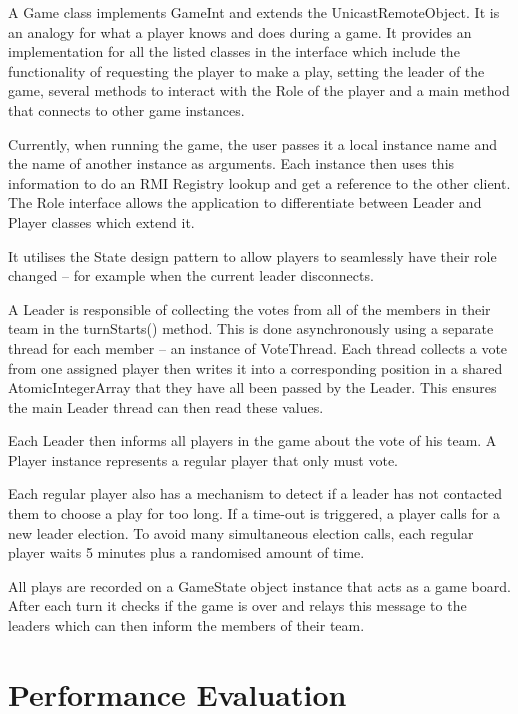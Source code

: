 \documentclass[conference]{IEEEtran}
\begin{document}
A Game class implements GameInt and extends the UnicastRemoteObject. It is an analogy for what a player knows and does during a game. It provides an implementation for all the listed classes in the interface which include the functionality of requesting the player to make a play, setting the leader of the game, several methods to interact with the Role of the player and a main method that connects to other game instances.
 
Currently, when running the game, the user passes it a local instance name and the name of another instance as arguments. Each instance then uses this information to do an RMI Registry lookup and get a reference to the other client. The Role interface allows the application to differentiate between Leader and Player classes which extend it. 

It utilises the State design pattern to allow players to seamlessly have their role changed – for example when the current leader disconnects. 

A Leader is responsible of collecting the votes from all of the members in their team in the turnStarts() method. This is done asynchronously using a separate thread for each member – an instance of VoteThread. Each thread collects a vote from one assigned player then writes it into a corresponding position in a shared AtomicIntegerArray that they have all been passed by the Leader. This ensures the main Leader thread can then read these values. 

Each Leader then informs all players in the game about the vote of his team. A Player instance represents a regular player that only must vote. 

Each regular player also has a mechanism to detect if a leader has not contacted them to choose a play for too long. If a time-out is triggered, a player calls for a new leader election. To avoid many simultaneous election calls, each regular player waits 5 minutes plus a randomised amount of time.

All plays are recorded on a GameState object instance that acts as a game board. After each turn it checks if the game is over and relays this message to the leaders which can then inform the members of their team.
 
 

\section{Performance Evaluation}
\end{document}
